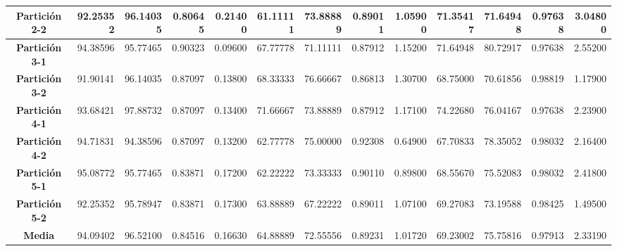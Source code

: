 \documentclass[a4paper,11pt]{article}
\begin{document}
\begin{table}[htbp]
\begin{adjustbox}{width=1.1\textwidth}
\begin{tabular}{|c|r|r|r|r|r|r|r|r|r|r|r|r|}
    \textbf{Partición 2-2} & 92.25352 & 96.14035 & 0.80645 & 0.21400 & 61.11111 & 73.88889 & 0.89011 & 1.05900 & 71.35417 & 71.64948 & 0.97638 & 3.04800 \\ \hline
    \textbf{Partición 3-1} & 94.38596 & 95.77465 & 0.90323 & 0.09600 & 67.77778 & 71.11111 & 0.87912 & 1.15200 & 71.64948 & 80.72917 & 0.97638 & 2.55200 \\ \hline
    \textbf{Partición 3-2} & 91.90141 & 96.14035 & 0.87097 & 0.13800 & 68.33333 & 76.66667 & 0.86813 & 1.30700 & 68.75000 & 70.61856 & 0.98819 & 1.17900 \\ \hline
    \textbf{Partición 4-1} & 93.68421 & 97.88732 & 0.87097 & 0.13400 & 71.66667 & 73.88889 & 0.87912 & 1.17100 & 74.22680 & 76.04167 & 0.97638 & 2.23900 \\ \hline
    \textbf{Partición 4-2} & 94.71831 & 94.38596 & 0.87097 & 0.13200 & 62.77778 & 75.00000 & 0.92308 & 0.64900 & 67.70833 & 78.35052 & 0.98032 & 2.16400 \\ \hline
    \textbf{Partición 5-1} & 95.08772 & 95.77465 & 0.83871 & 0.17200 & 62.22222 & 73.33333 & 0.90110 & 0.89800 & 68.55670 & 75.52083 & 0.98032 & 2.41800 \\ \hline
    \textbf{Partición 5-2} & 92.25352 & 95.78947 & 0.83871 & 0.17300 & 63.88889 & 67.22222 & 0.89011 & 1.07100 & 69.27083 & 73.19588 & 0.98425 & 1.49500 \\ \hline
    \textbf{Media} & 94.09402 & 96.52100 & 0.84516 & 0.16630 & 64.88889 & 72.55556 & 0.89231 & 1.01720 & 69.23002 & 75.75816 & 0.97913 & 2.33190 \\ \hline
    \end{tabular}
    \end{adjustbox}
    \label{BText}
  \end{table}  
  
\end{document}
